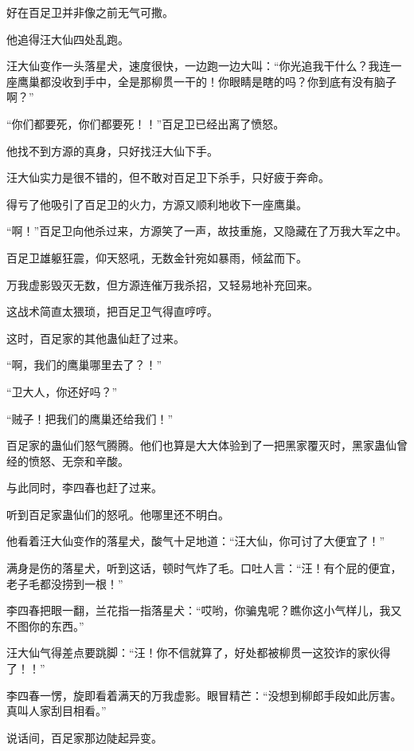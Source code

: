 
\begin{this_body}

好在百足卫并非像之前无气可撒。

他追得汪大仙四处乱跑。

汪大仙变作一头落星犬，速度很快，一边跑一边大叫：“你光追我干什么？我连一座鹰巢都没收到手中，全是那柳贯一干的！你眼睛是瞎的吗？你到底有没有脑子啊？”

“你们都要死，你们都要死！！”百足卫已经出离了愤怒。

他找不到方源的真身，只好找汪大仙下手。

汪大仙实力是很不错的，但不敢对百足卫下杀手，只好疲于奔命。

得亏了他吸引了百足卫的火力，方源又顺利地收下一座鹰巢。

“啊！”百足卫向他杀过来，方源笑了一声，故技重施，又隐藏在了万我大军之中。

百足卫雄躯狂震，仰天怒吼，无数金针宛如暴雨，倾盆而下。

万我虚影毁灭无数，但方源连催万我杀招，又轻易地补充回来。

这战术简直太猥琐，把百足卫气得直哼哼。

这时，百足家的其他蛊仙赶了过来。

“啊，我们的鹰巢哪里去了？！”

“卫大人，你还好吗？”

“贼子！把我们的鹰巢还给我们！”

百足家的蛊仙们怒气腾腾。他们也算是大大体验到了一把黑家覆灭时，黑家蛊仙曾经的愤怒、无奈和辛酸。

与此同时，李四春也赶了过来。

听到百足家蛊仙们的怒吼。他哪里还不明白。

他看着汪大仙变作的落星犬，酸气十足地道：“汪大仙，你可讨了大便宜了！”

满身是伤的落星犬，听到这话，顿时气炸了毛。口吐人言：“汪！有个屁的便宜，老子毛都没捞到一根！”

李四春把眼一翻，兰花指一指落星犬：“哎哟，你骗鬼呢？瞧你这小气样儿，我又不图你的东西。”

汪大仙气得差点要跳脚：“汪！你不信就算了，好处都被柳贯一这狡诈的家伙得了！！”

李四春一愣，旋即看着满天的万我虚影。眼冒精芒：“没想到柳郎手段如此厉害。真叫人家刮目相看。”

说话间，百足家那边陡起异变。


\end{this_body}
